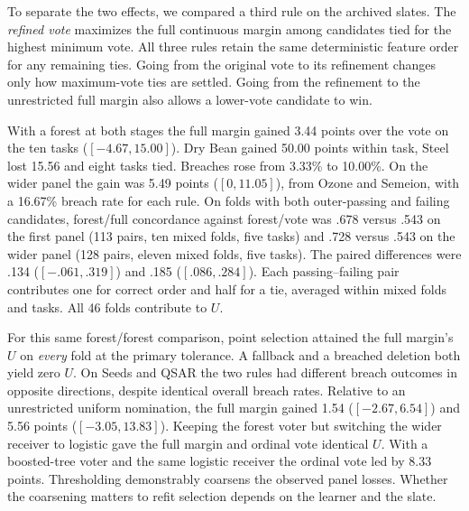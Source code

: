 To separate the two effects, we compared a third rule on the archived slates. The \emph{refined vote} maximizes the full continuous margin among candidates tied for the highest minimum vote. All three rules retain the same deterministic feature order for any remaining ties. Going from the original vote to its refinement changes only how maximum-vote ties are settled. Going from the refinement to the unrestricted full margin also allows a lower-vote candidate to win.

With a forest at both stages the full margin gained 3.44 points over the vote on the ten tasks ($[-4.67,15.00]$). Dry Bean gained 50.00 points within task, Steel lost 15.56 and eight tasks tied. Breaches rose from 3.33\% to 10.00\%. On the wider panel the gain was 5.49 points ($[0,11.05]$), from Ozone and Semeion, with a 16.67\% breach rate for each rule. On folds with both outer-passing and failing candidates, forest/full concordance against forest/vote was .678 versus .543 on the first panel (113 pairs, ten mixed folds, five tasks) and .728 versus .543 on the wider panel (128 pairs, eleven mixed folds, five tasks). The paired differences were .134 ($[-.061,.319]$) and .185 ($[.086,.284]$). Each passing--failing pair contributes one for correct order and half for a tie, averaged within mixed folds and tasks. All 46 folds contribute to $U$.

For this same forest/forest comparison, point selection attained the full margin's $U$ on \emph{every} fold at the primary tolerance. A fallback and a breached deletion both yield zero $U$. On Seeds and QSAR the two rules had different breach outcomes in opposite directions, despite identical overall breach rates. Relative to an unrestricted uniform nomination, the full margin gained 1.54 ($[-2.67,6.54]$) and 5.56 points ($[-3.05,13.83]$). Keeping the forest voter but switching the wider receiver to logistic gave the full margin and ordinal vote identical $U$. With a boosted-tree voter and the same logistic receiver the ordinal vote led by 8.33 points. Thresholding demonstrably coarsens the observed panel losses. Whether the coarsening matters to refit selection depends on the learner and the slate.

